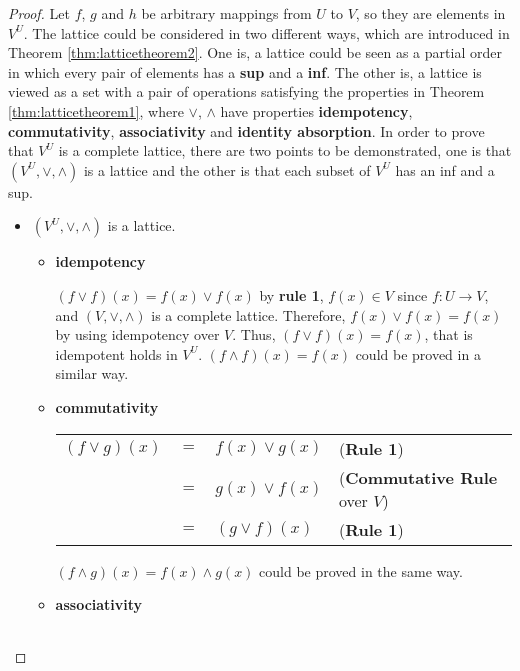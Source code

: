 \begin{proof}
Let $f$, $g$ and $h$ be arbitrary mappings from $U$ to $V$, so they are elements in $V^{U}$. The lattice could be considered in two different ways, which are introduced in Theorem \ref{thm:latticetheorem2}. One is, a lattice could be seen as a partial order in which every pair of elements has a \textbf{sup} and a \textbf{inf}. The other is, a lattice is viewed as a set with a pair of operations satisfying the properties in Theorem \ref{thm:latticetheorem1}, where $\vee$, $\wedge$ have properties \textbf{idempotency}, \textbf{commutativity}, \textbf{associativity} and \textbf{identity absorption}. In order to prove that $V^{U}$ is a complete lattice, there are two points to be demonstrated, one is that $(V^{U},\vee,\wedge)$ is a lattice and the other is that each subset of $V^{U}$ has an inf and a sup.

\begin{itemize}

\item $(V^{U},\vee,\wedge)$ is a lattice.

\begin{itemize}

\item \textbf{idempotency}

$(f \vee f)(x) = f(x) \vee f(x)$ by \textbf{rule 1}, $f(x) \in V$ since $f : U \rightarrow V$, and $(V,\vee,\wedge)$ is a complete lattice. Therefore, $f(x) \vee f(x) = f(x)$ by using idempotency over $V$. Thus, $(f \vee f)(x) = f(x)$, that is idempotent holds in $V^{U}$. $(f \wedge f)(x) = f(x)$ could be proved in a similar way.

\item \textbf{commutativity}

\begin{tabular}{l l l l}
$(f \vee g)(x)$ & $=$ & $f(x) \vee g(x)$ & (\textbf{Rule 1}) \\
                & $=$ & $g(x) \vee f(x)$ & (\textbf{Commutative Rule} over $V$) \\
                & $=$ & $(g \vee f)(x)$ & (\textbf{Rule 1}) \\
\end{tabular}

$(f \wedge g)(x) = f(x) \wedge g(x)$ could be proved in the same way.
 
\item \textbf{associativity}

\begin{tabular}{l l l l}


\end{tabular}
\end{itemize}
\end{itemize}
\end{proof}
